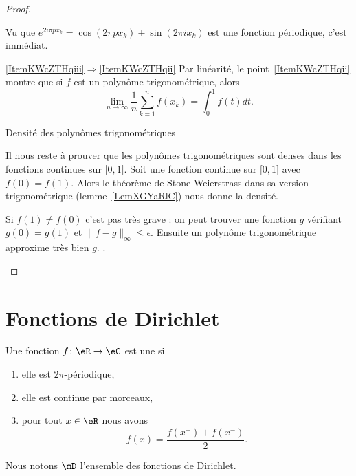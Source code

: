 \begin{proof}
\begin{subproof}
        Vu que \(  e^{2i\pi px_k}=\cos(2\pi px_k)+\sin(2\pi ix_k)\) est une fonction périodique, c'est immédiat.
    \item[\ref{ItemKWcZTHqiii}\( \Rightarrow\)\ref{ItemKWcZTHqii}]
        Par linéarité, le point~\ref{ItemKWcZTHqii} montre que si \( f\) est un polynôme trigonométrique, alors
        \begin{equation}
            \lim_{n\to \infty} \frac{1}{ n }\sum_{k=1}^nf(x_k)=\int_0^1f(t)dt.
        \end{equation}
    \item[Densité des polynômes trigonométriques]

        Il nous reste à prouver que les polynômes trigonométriques sont denses dans les fonctions continues sur \( \mathopen[ 0 , 1 \mathclose]\). Soit une fonction continue sur \( \mathopen[ 0 , 1 \mathclose]\) avec \( f(0)=f(1)\). Alors le théorème de Stone-Weierstrass dans sa version trigonométrique (lemme~\ref{LemXGYaRlC}) nous donne la densité.

        Si \( f(1)\neq f(0)\) c'est pas très grave : on peut trouver une fonction \( g\) vérifiant \( g(0)=g(1) \) et \( \| f-g \|_{\infty}\leq \epsilon\). Ensuite un polynôme trigonométrique approxime très bien \( g\).
        .
    \end{subproof}
\end{proof}

\section{Fonctions de Dirichlet}

\begin{definition}
    Une fonction \( f\colon \eR\to \eC\) est une  si
    \begin{enumerate}
        \item
            elle est \( 2\pi\)-périodique,
        \item
            elle est continue par morceaux,
        \item
            pour tout \( x\in \eR\) nous avons
            \begin{equation}
                f(x)=\frac{ f(x^+)+f(x^-) }{2}.
            \end{equation}
    \end{enumerate}
    Nous notons \( \mD\) l'ensemble des fonctions de Dirichlet.
\end{definition}


